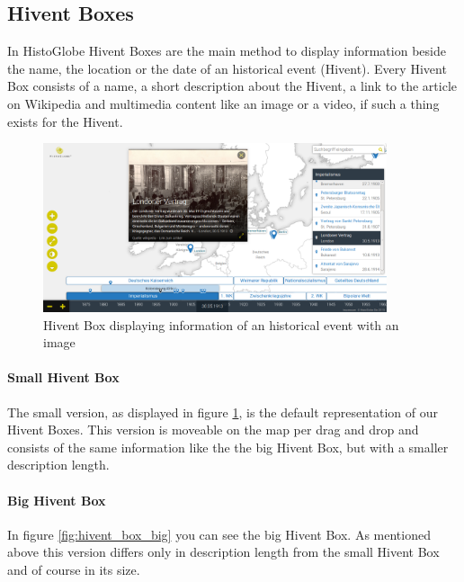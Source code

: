 \subsection{Hivent Boxes}
In HistoGlobe Hivent Boxes are the main method to display information beside the name, the location or the date of an historical event (Hivent). Every Hivent Box consists of a name, a short description about the Hivent, a link to the article on Wikipedia and multimedia content like an image or a video, if such a thing exists for the Hivent.

\begin{figure}[H]
  \begin{center}
    \includegraphics[width=0.9\textwidth]{graphics/hivent_box.png}
  \end{center}
  \caption{Hivent Box displaying information of an historical event with an image}
  \label{fig:hivent_box}
\end{figure}


\paragraph{Small Hivent Box} %
The small version, as displayed in figure \ref{fig:hivent_box}, is the default representation of our Hivent Boxes. This version is moveable on the map per drag and drop and consists of the same information like the the big Hivent Box, but with a smaller description length.

\paragraph{Big Hivent Box} %
In figure \ref{fig:hivent_box_big} you can see the big Hivent Box. As mentioned above this version differs only in description length from the small Hivent Box and of course in its size. 

